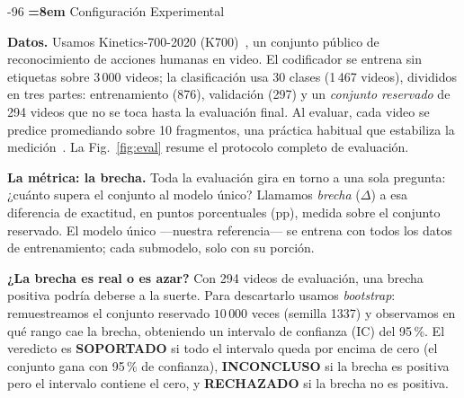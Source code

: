 \documentclass[runningheads]{llncs}
\makeatletter
\renewcommand\section{\@startsection{section}{1}{\z@}%
   {-9\p@ \@plus -2\p@ \@minus -2\p@}{6\p@ \@plus 2\p@ \@minus 2\p@}%
   {\normalfont\large\bfseries\boldmath\rightskip=\z@ \@plus 8em\pretolerance=10000 }}
\makeatother
\begin{document}
\section{Configuración Experimental}
\label{sec:setup}

\textbf{Datos.} Usamos Kinetics-700-2020 (K700)~\cite{smaira2020short}, un
conjunto público de reconocimiento de acciones humanas en video. El codificador
se entrena sin etiquetas sobre 3\,000 videos;
la clasificación usa 30 clases (1\,467 videos),
divididos en tres partes: entrenamiento (876),
validación (297) y un \emph{conjunto reservado} de 294 videos que no se toca
hasta la evaluación final. Al
evaluar, cada video se predice promediando sobre 10 fragmentos, una práctica
habitual que estabiliza la medición~\cite{wang2018temporal}. La
Fig.~\ref{fig:eval} resume el protocolo completo de evaluación.

\textbf{La métrica: la brecha.} Toda la evaluación gira en torno a una sola
pregunta: ¿cuánto supera el conjunto al modelo único? Llamamos \emph{brecha}
($\Delta$) a esa diferencia de exactitud, en puntos porcentuales (pp), medida
sobre el conjunto reservado. El modelo único ---nuestra referencia--- se
entrena con todos los datos de entrenamiento; cada submodelo, solo con su
porción.

\textbf{¿La brecha es real o es azar?} Con 294 videos de evaluación, una brecha
positiva podría deberse a la suerte. Para descartarlo usamos
\emph{bootstrap}: remuestreamos el conjunto reservado $10\,000$ veces
(semilla 1337) y observamos en qué rango cae la brecha, obteniendo un intervalo
de confianza (IC) del 95\,\%. El veredicto es \textbf{SOPORTADO} si todo el
intervalo queda por encima de cero (el conjunto gana con 95\,\% de confianza),
\textbf{INCONCLUSO} si la brecha es positiva pero el intervalo contiene el
cero, y \textbf{RECHAZADO} si la brecha no es positiva.
\end{document}
